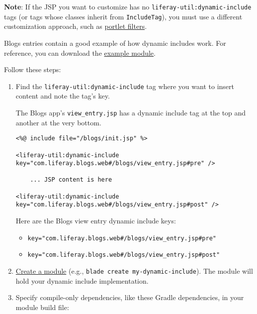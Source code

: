 \noindent\hrulefill

\textbf{Note}: If the JSP you want to customize has no
\texttt{liferay-util:dynamic-include} tags (or tags whose classes
inherit from \texttt{IncludeTag}), you must use a different
customization approach, such as
\href{/docs/7-2/customization/-/knowledge_base/c/jsp-overrides-using-portlet-filters}{portlet
filters}.

\noindent\hrulefill

Blogs entries contain a good example of how dynamic includes work. For
reference, you can download the
\href{https://portal.liferay.dev/documents/113763090/114000186/example-dynamic-include-blogs-master.zip}{example
module}.

Follow these steps:

\begin{enumerate}
\def\labelenumi{\arabic{enumi}.}
\item
  Find the \texttt{liferay-util:dynamic-include} tag where you want to
  insert content and note the tag's key.

  The Blogs app's \texttt{view\_entry.jsp} has a dynamic include tag at
  the top and another at the very bottom.

\begin{verbatim}
<%@ include file="/blogs/init.jsp" %>

<liferay-util:dynamic-include key="com.liferay.blogs.web#/blogs/view_entry.jsp#pre" />

    ... JSP content is here

<liferay-util:dynamic-include key="com.liferay.blogs.web#/blogs/view_entry.jsp#post" />
\end{verbatim}

  Here are the Blogs view entry dynamic include keys:

  \begin{itemize}
  \tightlist
  \item
    \texttt{key="com.liferay.blogs.web\#/blogs/view\_entry.jsp\#pre"}
  \item
    \texttt{key="com.liferay.blogs.web\#/blogs/view\_entry.jsp\#post"}
  \end{itemize}
\item
  \href{/docs/7-2/reference/-/knowledge_base/r/creating-a-project}{Create
  a module} (e.g., \texttt{blade\ create\ my-dynamic-include}). The
  module will hold your dynamic include implementation.
\item
  Specify compile-only dependencies, like these Gradle dependencies, in
  your module build file:


\end{enumerate}
